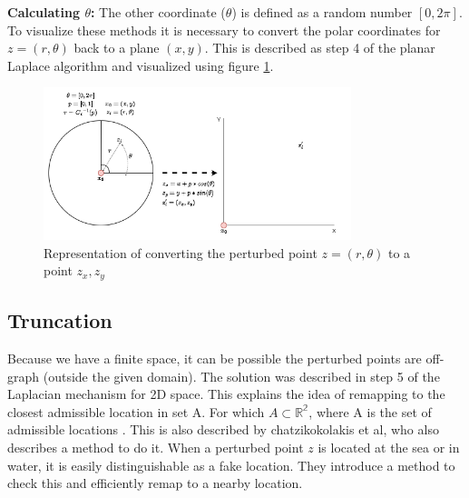 \textbf{Calculating $\theta$:}
The other coordinate ($\theta$) is defined as a random number $[0, 2\pi]$. \newline \newline
To visualize these methods it is necessary to convert the polar coordinates for $z = (r, \theta)$ back to a plane $(x, y)$.
This is described as step 4 of the planar Laplace algorithm \citep{DBLP:journals/corr/abs-1212-1984} and visualized using figure \ref{figure:geo}.
\begin{figure}[h] \label{figure:geo}
  \includegraphics[width=0.8\textwidth]{TheorethicalFramework/ND-Laplace/Images/polar-laplace-to-planar.png}
  \centering
  \caption{Representation of converting the perturbed point $z = (r, \theta)$ to a point ${z_x, z_y}$}
\end{figure}



\newpage
\subsection{Truncation} \label{theory:truncation}
Because we have a finite space, it can be possible the perturbed points are off-graph (outside the given domain).
The solution was described in step 5 of the Laplacian mechanism for 2D space. This explains the idea of remapping to the closest admissible location in set A.
For which $A \subset \mathbb{R^2}$, where A is the set of admissible locations \citep{DBLP:journals/corr/abs-1212-1984}.
This is also described by chatzikokolakis et al, who also describes a method to do it.
When a perturbed point $z$ is located at the sea or in water, it is easily distinguishable as a fake location.
They introduce a method to check this and efficiently remap to a nearby location.

